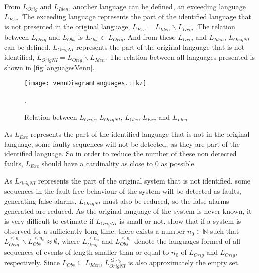 From $L_{Orig}$ and $L_{Iden}$, another language can be defined, an exceeding
language $L_{Exc}$. The exceeding language represents the part of the identified language that is not presented in the
original language, $L_{Exc}=L_{Iden}\backslash L_{Orig}$.  The
relation between $L_{Orig}$ and $L_{Obs}$ is $L_{Obs} \subset L_{Orig}$.
And from
these $L_{Orig}$ and $L_{Iden}$, $L_{OrigNI}$ can be defined. $L_{OrigNI}$
represents the part of the
original language that is not identified, $L_{OrigNI}=L_{Orig}\backslash L_{Iden}$.
The relation between all languages presented is shown in \autoref{fig:languagesVenn}.

\usetikzlibrary{patterns}
\begin{figure}[H]
  \centering
    \texttt{[image: vennDiagramLanguages.tikz]}
  \caption{Relation between $L_{Orig}$, $L_{OrigNI}$,
    $L_{Obs}$, $L_{Exc}$ and $L_{Iden}$}.
  
  \label{fig:languagesVenn}
\end{figure}
As $L_{Exc}$ represents the part of the identified language that is not in
the original language, some faulty sequences will not be detected, as they are
part of the identified language. So in order to reduce the number of these non
detected faults, $L_{Exc}$ should have a cardinality as close to $0$ as 
possible.

As $L_{OrigNI}$ represents the part of the original system that is not
identified, some sequences in the fault-free behaviour of the
system will be detected as faults, generating false alarms. $L_{OrigNI}$ must
also be reduced, so the false alarms generated are reduced. As the original
language of the system is never known, it is very difficult to estimate if
$L_{OrigNI}$ is small or not. \cite{klein2005fault} show that if a system is
observed for a sufficiently long time, there exists a number $n_0\in \mathbb{N}$
such that $L_{Orig}^{\leq n_0}\backslash L_{Obs}^{\leq n_0}\approx \emptyset$,
where $L_{Orig}^{\leq n_0}$ and $L_{Obs}^{\leq n_0}$ denote the languages formed
of all sequences of events of length smaller than or equal to $n_0$ of
$L_{Orig}$ and $L_{Orig}$, respectively. Since $L_{Obs}\subseteq L_{Iden}$, $L_{OrigNI}^{\leq
  n_0}$ is also approximately the empty set.

